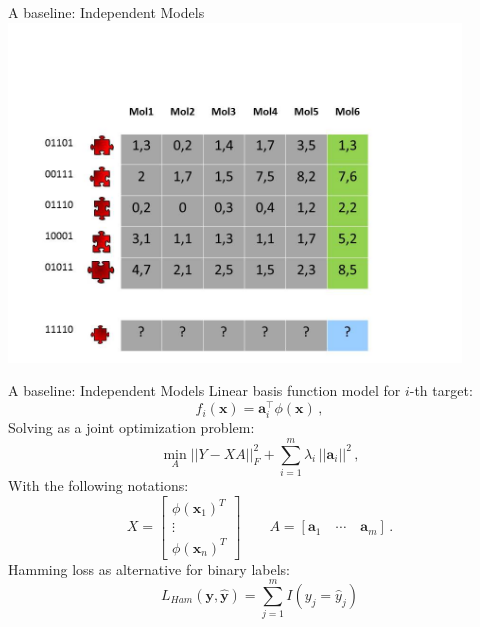 \documentclass[]{beamer}
\renewcommand{\vec}[1]{\boldsymbol{#1}}
\begin{document}
\begin{frame}{A baseline: Independent Models}
\includegraphics[width=0.9\textwidth,trim = 0 0 100 100,clip]{Figures/pictures/Slide15}
\end{frame}

\begin{frame}{A baseline: Independent Models}
\vspace{0.5cm}
Linear basis function model for $i$-th target: 
\begin{equation*}
f_i(\vec{x}) = \vec{a}_i^\intercal \phi(\vec{x}) \,,
\label{eq:binrel}
\end{equation*}
Solving as a joint optimization problem: 
\begin{equation*}
\label{eq:multiridge}
\min_A ||Y - XA ||^2_F +  \sum_{i=1}^m \lambda_i \,||\vec{a}_i||^2 \,,
\end{equation*}
With the following notations: 
\begin{equation*}
\label{eq:notation}
X = \begin{bmatrix} \phi(\vec{x}_1)^T \\ \vdots \\ \phi(\vec{x}_n)^T \end{bmatrix} \qquad A = [\vec{a}_1 \quad \cdots \quad \vec{a}_m] \,.
\end{equation*}
Hamming loss as alternative for binary labels: 
$${\displaystyle L_{\textit{Ham}}(\vec{y},\hat{\vec{y}}) = \sum_{j=1}^m I(y_j = \hat{y}_j)}$$


\end{frame}
\end{document}
